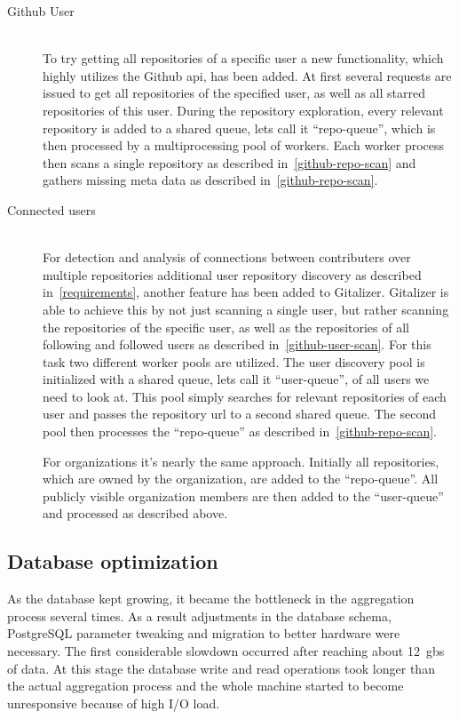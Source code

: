 \begin{description}
    \item[Github User]\label{github-repo-scan} \hfill \\
        To try getting all repositories of a specific user a new functionality, which highly utilizes the Github \ac{api}, has been added.
        At first several requests are issued to get all repositories of the specified user, as well as all starred repositories of this user.
        During the repository exploration, every relevant repository is added to a shared queue, lets call it ``repo-queue'', which is then processed by a multiprocessing pool of workers.
        Each worker process then scans a single repository as described in~\ref{github-repo-scan} and gathers missing meta data as described in~\ref{github-repo-scan}.


    \item[Connected users]\label{github-repo-scan} \hfill \\
        For detection and analysis of connections between contributers over multiple repositories additional user repository discovery as described in~\ref{requirements}, another feature has been added to Gitalizer.
        Gitalizer is able to achieve this by not just scanning a single user, but rather scanning the repositories of the specific user, as well as the repositories of all following and followed users as described in~\ref{github-user-scan}.
        For this task two different worker pools are utilized.
        The user discovery pool is initialized with a shared queue, lets call it ``user-queue'', of all users we need to look at.
        This pool simply searches for relevant repositories of each user and passes the repository \ac{url} to a second shared queue.
        The second pool then processes the ``repo-queue'' as described in~\ref{github-repo-scan}.

        For organizations it's nearly the same approach.
        Initially all repositories, which are owned by the organization, are added to the ``repo-queue''.
        All publicly visible organization members are then added to the ``user-queue'' and processed as described above.
\end{description}


\subsection{Database optimization}
As the database kept growing, it became the bottleneck in the aggregation process several times.
As a result adjustments in the database schema, PostgreSQL parameter tweaking and migration to better hardware were necessary.
The first considerable slowdown occurred after reaching about 12~\acp{gb} of data.
At this stage the database write and read operations took longer than the actual aggregation process and the whole machine started to become unresponsive because of high I/O load.


